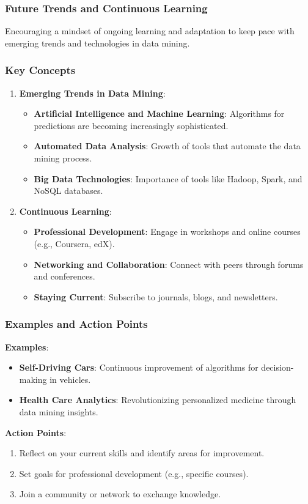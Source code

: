 \documentclass{beamer}
\begin{document}
\begin{frame}[fragile]
    \frametitle{Future Trends and Continuous Learning}
    Encouraging a mindset of ongoing learning and adaptation to keep pace with emerging trends and technologies in data mining.
\end{frame}

\begin{frame}[fragile]
    \frametitle{Key Concepts}
    \begin{enumerate}
        \item \textbf{Emerging Trends in Data Mining}:
        \begin{itemize}
            \item \textbf{Artificial Intelligence and Machine Learning}: Algorithms for predictions are becoming increasingly sophisticated.
            \item \textbf{Automated Data Analysis}: Growth of tools that automate the data mining process.
            \item \textbf{Big Data Technologies}: Importance of tools like Hadoop, Spark, and NoSQL databases.
        \end{itemize}
        \item \textbf{Continuous Learning}:
        \begin{itemize}
            \item \textbf{Professional Development}: Engage in workshops and online courses (e.g., Coursera, edX).
            \item \textbf{Networking and Collaboration}: Connect with peers through forums and conferences.
            \item \textbf{Staying Current}: Subscribe to journals, blogs, and newsletters.
        \end{itemize}
    \end{enumerate}
\end{frame}

\begin{frame}[fragile]
    \frametitle{Examples and Action Points}
    \textbf{Examples}:
    \begin{itemize}
        \item \textbf{Self-Driving Cars}: Continuous improvement of algorithms for decision-making in vehicles.
        \item \textbf{Health Care Analytics}: Revolutionizing personalized medicine through data mining insights.
    \end{itemize}

    \textbf{Action Points}:
    \begin{enumerate}
        \item Reflect on your current skills and identify areas for improvement.
        \item Set goals for professional development (e.g., specific courses).
        \item Join a community or network to exchange knowledge.
    \end{enumerate}
\end{frame}
\end{document}
